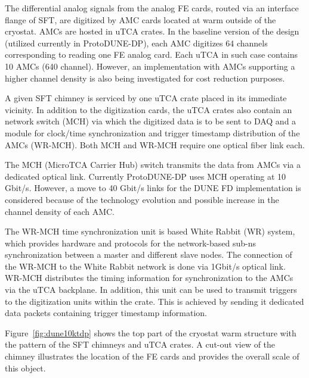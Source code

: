 The differential analog signals from the analog FE cards, routed via an interface flange of SFT, are digitized by AMC cards located at warm outside of the cryostat. AMCs are hosted in uTCA crates. In the baseline version of the design (utilized currently in ProtoDUNE-DP), each AMC digitizes \num{64} channels corresponding to reading one FE analog card. Each uTCA in such case contains \num{10} AMCs (\num{640} channel). However, an implementation with AMCs supporting a higher channel density is also being investigated for cost reduction purposes. 


A given SFT chimney is serviced by one uTCA crate placed in its immediate vicinity. In addition to the digitization cards, the uTCA crates also contain an network switch (MCH) via which the digitized data is to be sent to DAQ and a module for clock/time synchronization and trigger timestamp distribution of the AMCs (WR-MCH). Both MCH and WR-MCH require one optical fiber link each. 

The MCH (MicroTCA Carrier Hub) switch transmits the data from AMCs via a dedicated optical link. Currently ProtoDUNE-DP uses MCH operating at 10 Gbit/s. However, a move to 40 Gbit/s links for the DUNE FD implementation is considered because of the technology evolution and possible increase in the channel density of each AMC.

The WR-MCH time synchronization unit is based White Rabbit (WR) system, which provides hardware and protocols for the network-based sub-ns synchronization between a master and different slave nodes. The connection of the WR-MCH to the White Rabbit network is done via \num{1}\si{Gbit/s} optical link. WR-MCH distributes the timing information for synchronization to the AMCs via the uTCA backplane. In addition, this unit can be used to transmit triggers to the digitization units within the crate. This is achieved by sending it dedicated data packets containing trigger timestamp information. 

Figure~\ref{fig:dune10ktdp} shows the top part of the cryostat warm structure with the pattern of the SFT chimneys and uTCA crates. A cut-out view of the chimney illustrates the location of the FE cards and provides the overall scale of this object. 


